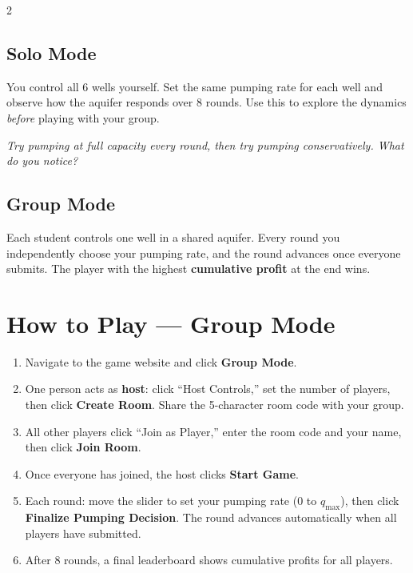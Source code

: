 \documentclass[11pt, letterpaper]{article}
\begin{document}
\begin{multicols}{2}
\subsection*{Solo Mode}
You control all 6 wells yourself. Set the same pumping rate for each well and observe how the aquifer responds over 8 rounds. Use this to explore the dynamics \emph{before} playing with your group.

\textit{Try pumping at full capacity every round, then try pumping conservatively. What do you notice?}

\columnbreak

\subsection*{Group Mode}
Each student controls one well in a shared aquifer. Every round you independently choose your pumping rate, and the round advances once everyone submits. The player with the highest \textbf{cumulative profit} at the end wins.
\end{multicols}

\section{How to Play --- Group Mode}

\begin{enumerate}
  \item Navigate to the game website and click \textbf{Group Mode}.
  \item One person acts as \textbf{host}: click ``Host Controls,'' set the number of players, then click \textbf{Create Room}. Share the 5-character room code with your group.
  \item All other players click ``Join as Player,'' enter the room code and your name, then click \textbf{Join Room}.
  \item Once everyone has joined, the host clicks \textbf{Start Game}.
  \item Each round: move the slider to set your pumping rate ($0$ to $q_{\max}$), then click \textbf{Finalize Pumping Decision}. The round advances automatically when all players have submitted.
  \item After 8 rounds, a final leaderboard shows cumulative profits for all players.
\end{enumerate}
\end{document}
